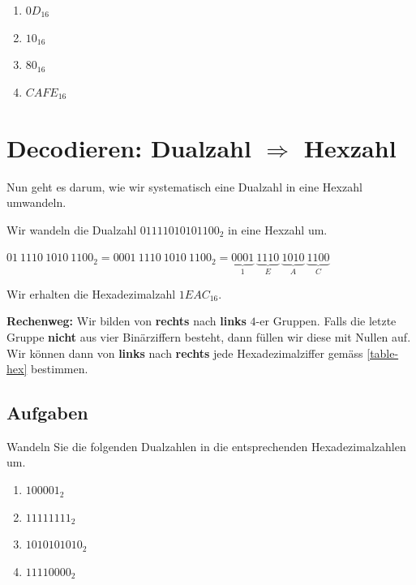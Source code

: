 \begin{enumerate}
\item $0D_{16}$
\fillwithgrid{0.25in}
\item $10_{16}$
\fillwithgrid{0.25in}
\item $80_{16}$
\fillwithgrid{0.25in}
\item $CAFE_{16}$
\fillwithgrid{0.25in}
\end{enumerate}

\section{Decodieren: Dualzahl $\Rightarrow$ Hexzahl}

Nun geht es darum, wie wir systematisch eine Dualzahl in eine Hexzahl umwandeln.

\begin{example}

Wir wandeln die Dualzahl $01111010101100_{2}$ in eine Hexzahl um.

\begin{center}
$01~1110~1010~1100_{2} = 0001~1110~1010~1100_{2} = \underbrace{0001}_{1}~\underbrace{1110}_{E}~\underbrace{1010}_{A}~\underbrace{1100}_{C}$
\end{center}

Wir erhalten die Hexadezimalzahl $1EAC_{16}$.

\end{example}

\textbf{Rechenweg:} Wir bilden von \textbf{rechts} nach \textbf{links} $4$-er Gruppen. Falls die letzte Gruppe \textbf{nicht} aus vier Binärziffern besteht, dann füllen wir diese mit Nullen auf. Wir können dann von \textbf{links} nach \textbf{rechts} jede Hexadezimalziffer gemäss \autoref{table-hex} bestimmen.

\subsection{Aufgaben}
\label{subsection-dual2hex-aufgaben}

Wandeln Sie die folgenden Dualzahlen in die entsprechenden Hexadezimalzahlen um.

\begin{enumerate}
\item $100001_{2}$
\fillwithgrid{0.25in}
\item $11111111_{2}$
\fillwithgrid{0.25in}
\item $1010101010_{2}$
\fillwithgrid{0.25in}
\item $11110000_{2}$
\fillwithgrid{0.25in}
\end{enumerate}


